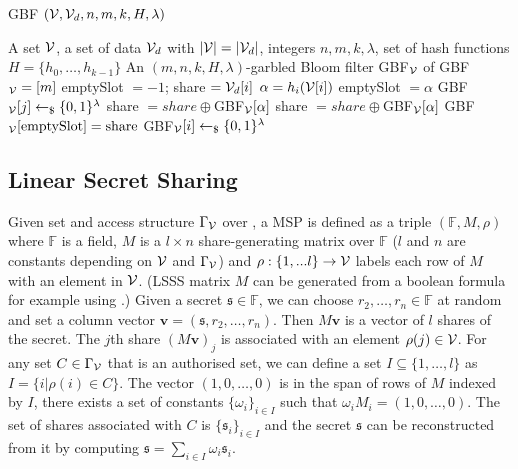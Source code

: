 \begin{algorithm}[htb]
\caption{GBF $(\mathcal{V}, \mathcal{V}_d , n, m, k, H, \lambda)$}
\label{alg:gbf}
\begin{algorithmic}[1]
\REQUIRE A set $\mathcal{V}$, a set of data $\mathcal{V}_d$ with $|\mathcal{V}|=|\mathcal{V}_d|$, integers $n, m, k, \lambda$, set of hash functions $H=\{h_0, \dots, h_{k-1}\}$
\ENSURE An $(m, n, k, H, \lambda)$-garbled Bloom filter GBF$_\mathcal{V}$ of \key
\STATE GBF$_\mathcal{V} = [m]$ 
  \STATE emptySlot $= -1$; share $=\mathcal{V}_d[i]$
    \STATE $\alpha=h_i(\mathcal{V}[i])$
        \STATE emptySlot $= \alpha$
        \ELSE
          \STATE GBF$_\mathcal{V}[j] \gets_{\$} \{0,1\}^\lambda$
          \STATE share $= share \oplus$GBF$_\mathcal{V}[\alpha]$
      \ENDIF
      \ELSE
        \STATE share $= share \oplus$GBF$_\mathcal{V}[\alpha]$
    \ENDIF
  \ENDFOR
  \STATE GBF$_\mathcal{V}[\text{emptySlot}]=\text{share}$
\ENDFOR
{}
    \STATE GBF$_\mathcal{V}[i] \gets_{\$} \{0,1\}^\lambda$
  \ENDIF
\ENDFOR
\end{algorithmic}
\end{algorithm}

\subsection{Linear Secret Sharing}
Given set \ServerSet and access structure $\Gamma_\mathcal{V}$ over \ServerSet, a \ac{MSP} is defined as a triple $(\mathbb{F},M,\rho)$ where $\mathbb{F}$ is a field, $M$ is a $l\times n$ share-generating matrix over $\mathbb{F}$ ($l$ and $n$ are constants depending on  $\mathcal{V}$ and $\Gamma_\mathcal{V}$) and $\rho:\{1,...l\}\rightarrow \mathcal{V}$ labels each row of $M$ with an element in $\mathcal{V}$. 
(\ac{LSSS} matrix $M$ can be generated from a boolean formula for example using \citet[Algorithm 1]{LiuC10}.)
Given a secret $\mathfrak{s}\in \mathbb{F}$, we can choose $r_2,\ldots,r_n \in \mathbb{F}$ at random and set a column vector $\mathbf{v}=(\mathfrak{s},r_2,\ldots,r_n)$. 
Then $M\mathbf{v}$ is a vector of $l$ shares of the secret. 
The $j$th share $(M\mathbf{v})_{j}$ is associated with an element $\rho(j) \in \mathcal{V}$. 
For any set $C\in \Gamma_\mathcal{V}$ that is an authorised set, we can define a set $I\subseteq \{1,\ldots,l\}$ as $I=\{i|\rho(i)\in C\}$. 
The vector $(1,0,\ldots,0)$ is in the span of rows of $M$ indexed by $I$, \ie there exists a set of constants $\{\omega_i\}_{i\in I}$ such that $\omega_iM_i=(1,0,\ldots,0)$. 
The set of shares associated with $C$ is $\{\mathfrak{s}_i\}_{i\in I}$ and the secret $\mathfrak{s}$ can be reconstructed from it by computing $\mathfrak{s}=\sum_{i\in I}\omega_i\mathfrak{s}_i$.

